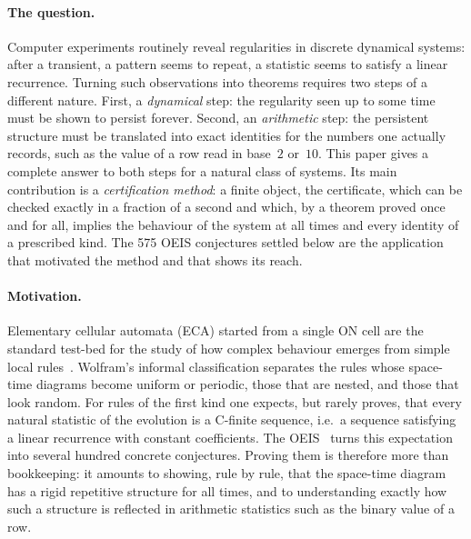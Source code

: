 \documentclass[11pt]{article}
\theoremstyle{definition}
\theoremstyle{remark}
\begin{document}
\paragraph{The question.} Computer experiments routinely reveal regularities in discrete dynamical systems: after a transient, a pattern seems to repeat, a statistic seems to satisfy a linear recurrence. Turning such observations into theorems requires two steps of a different nature. First, a \emph{dynamical} step: the regularity seen up to some time must be shown to persist forever. Second, an \emph{arithmetic} step: the persistent structure must be translated into exact identities for the numbers one actually records, such as the value of a row read in base~$2$ or~$10$. This paper gives a complete answer to both steps for a natural class of systems. Its main contribution is a \emph{certification method}: a finite object, the certificate, which can be checked exactly in a fraction of a second and which, by a theorem proved once and for all, implies the behaviour of the system at all times and every identity of a prescribed kind. The 575 OEIS conjectures settled below are the application that motivated the method and that shows its reach.

\paragraph{Motivation.} Elementary cellular automata (ECA) started from a single ON cell are the standard test-bed for the study of how complex behaviour emerges from simple local rules~\cite{wolfram}. Wolfram's informal classification separates the rules whose space-time diagrams become uniform or periodic, those that are nested, and those that look random. For rules of the first kind one expects, but rarely proves, that every natural statistic of the evolution is a C-finite sequence, i.e.\ a sequence satisfying a linear recurrence with constant coefficients. The OEIS~\cite{oeis} turns this expectation into several hundred concrete conjectures. Proving them is therefore more than bookkeeping: it amounts to showing, rule by rule, that the space-time diagram has a rigid repetitive structure for all times, and to understanding exactly how such a structure is reflected in arithmetic statistics such as the binary value of a row.
\end{document}
